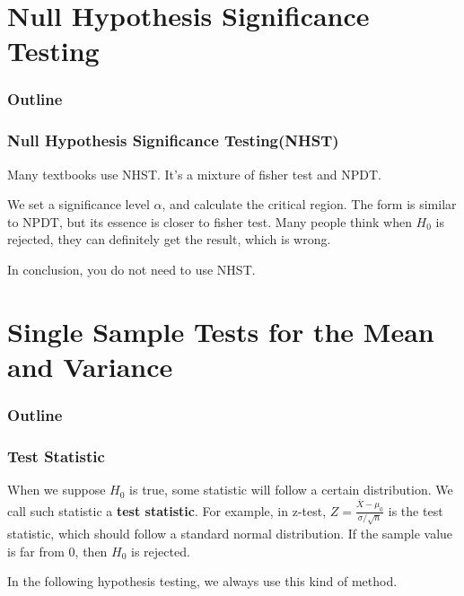 \documentclass{beamer}
\begin{document}
\section{Null Hypothesis Significance Testing}
\begin{frame}
    \frametitle{Outline}
    \tableofcontents[currentsection]
\end{frame}

\begin{frame}
    \frametitle{Null Hypothesis Significance Testing(NHST)}
    Many textbooks use NHST. It's a mixture of fisher test and NPDT.\par
    We set a significance level $\alpha$, and calculate the critical region. The form is similar to NPDT, but its essence is closer to fisher test. Many people think when $H_0$ is rejected, they can definitely get the result, which is wrong.\par
    \vspace*{0.3cm}
    In conclusion, you do not need to use NHST.
    

\end{frame}

\section{Single Sample Tests for the Mean and Variance}
\begin{frame}
    \frametitle{Outline}
    \tableofcontents[currentsection]
    

\end{frame}

\begin{frame}
    \frametitle{Test Statistic}
    When we suppose $H_0$ is true, some statistic will follow a certain distribution. We call such statistic a \textbf{test statistic}. For example, in z-test, $Z=\frac{\overline{X}-\mu_0}{\sigma/\sqrt{n}}$ is the test statistic, which should follow a standard normal distribution. If the sample value is far from 0, then $H_0$ is rejected.\par
    In the following hypothesis testing, we always use this kind of method.

\end{frame}
\end{document}
